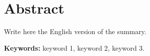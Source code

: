 \chapter{Abstract}
\begin{otherlanguage}{english}

Write here the English version of the summary.

\medskip\noindent
\textbf{Keywords:} keyword 1, keyword 2, keyword 3.

\end{otherlanguage}
